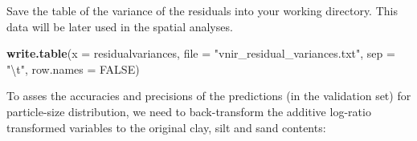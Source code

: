 \documentclass[]{book}
\newenvironment{Shaded}{\begin{snugshade}}{\end{snugshade}}
\newcommand{\CharTok}[1]{\textcolor[rgb]{0.31,0.60,0.02}{#1}}
\newcommand{\DataTypeTok}[1]{\textcolor[rgb]{0.13,0.29,0.53}{#1}}
\newcommand{\KeywordTok}[1]{\textcolor[rgb]{0.13,0.29,0.53}{\textbf{#1}}}
\newcommand{\NormalTok}[1]{#1}
\newcommand{\OperatorTok}[1]{\textcolor[rgb]{0.81,0.36,0.00}{\textbf{#1}}}
\newcommand{\OtherTok}[1]{\textcolor[rgb]{0.56,0.35,0.01}{#1}}
\newcommand{\StringTok}[1]{\textcolor[rgb]{0.31,0.60,0.02}{#1}}
\begin{document}
\begin{Shaded}
\end{Shaded}

Save the table of the variance of the residuals into your working directory. This data will be later used in the spatial analyses.

\begin{Shaded}
\begin{Highlighting}[]
\KeywordTok{write.table}\NormalTok{(}\DataTypeTok{x =}\NormalTok{ residualvariances, }
            \DataTypeTok{file =} \StringTok{"vnir_residual_variances.txt"}\NormalTok{,}
            \DataTypeTok{sep =} \StringTok{"}\CharTok{\textbackslash{}t}\StringTok{"}\NormalTok{,}
            \DataTypeTok{row.names =} \OtherTok{FALSE}\NormalTok{)}
\end{Highlighting}
\end{Shaded}

To asses the accuracies and precisions of the predictions (in the validation set) for particle-size distribution, we need to back-transform the additive log-ratio transformed variables to the original clay, silt and sand contents:
\end{document}
